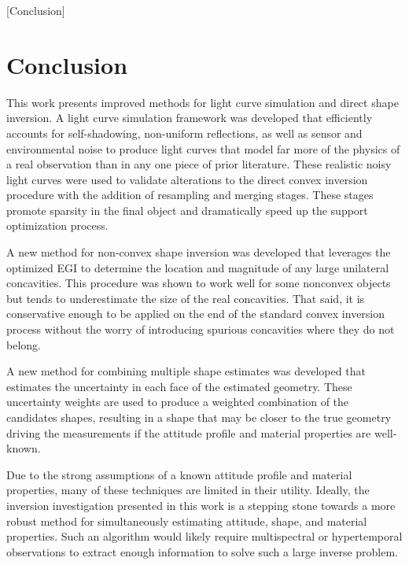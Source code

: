 [Conclusion]

\chapter{Conclusion}

This work presents improved methods for light curve simulation and direct shape inversion. A light curve simulation framework was developed that efficiently accounts for self-shadowing, non-uniform reflections, as well as sensor and environmental noise to produce light curves that model far more of the physics of a real observation than in any one piece of prior literature. These realistic noisy light curves were used to validate alterations to the direct convex inversion procedure with the addition of resampling and merging stages. These stages promote sparsity in the final object and dramatically speed up the support optimization process. 

A new method for non-convex shape inversion was developed that leverages the optimized EGI to determine the location and magnitude of any large unilateral concavities. This procedure was shown to work well for some nonconvex objects but tends to underestimate the size of the real concavities. That said, it is conservative enough to be applied on the end of the standard convex inversion process without the worry of introducing spurious concavities where they do not belong.

A new method for combining multiple shape estimates was developed that estimates the uncertainty in each face of the estimated geometry. These uncertainty weights are used to produce a weighted combination of the candidates shapes, resulting in a shape that may be closer to the true geometry driving the measurements if the attitude profile and material properties are well-known. 

Due to the strong assumptions of a known attitude profile and material properties, many of these techniques are limited in their utility. Ideally, the inversion investigation presented in this work is a stepping stone towards a more robust method for simultaneously estimating attitude, shape, and material properties. Such an algorithm would likely require multispectral or hypertemporal observations to extract enough information to solve such a large inverse problem.


